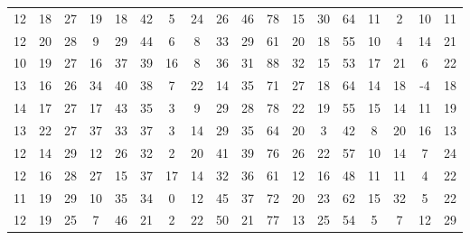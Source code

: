 \begin{sidewaystable}
\begin{tabular}{cccccccccccccccccc}
    12    & 18    & 27    & 19    & 18    & 42    & 5     & 24    & 26    & 46     & 78     & 15     & 30     & 64     & 11     & 2      & 10     & 11     \\
    12    & 20    & 28    & 9     & 29    & 44    & 6     & 8     & 33    & 29     & 61     & 20     & 18     & 55     & 10     & 4      & 14     & 21     \\
    10    & 19    & 27    & 16    & 37    & 39    & 16    & 8     & 36    & 31     & 88     & 32     & 15     & 53     & 17     & 21     & 6      & 22     \\
    13    & 16    & 26    & 34    & 40    & 38    & 7     & 22    & 14    & 35     & 71     & 27     & 18     & 64     & 14     & 18     & -4     & 18     \\
    14    & 17    & 27    & 17    & 43    & 35    & 3     & 9     & 29    & 28     & 78     & 22     & 19     & 55     & 15     & 14     & 11     & 19     \\
    13    & 22    & 27    & 37    & 33    & 37    & 3     & 14    & 29    & 35     & 64     & 20     & 3      & 42     & 8      & 20     & 16     & 13     \\
    12    & 14    & 29    & 12    & 26    & 32    & 2     & 20    & 41    & 39     & 76     & 26     & 22     & 57     & 10     & 14     & 7      & 24     \\
    12    & 16    & 28    & 27    & 15    & 37    & 17    & 14    & 32    & 36     & 61     & 12     & 16     & 48     & 11     & 11     & 4      & 22     \\
    11    & 19    & 29    & 10    & 35    & 34    & 0     & 12    & 45    & 37     & 72     & 20     & 23     & 62     & 15     & 32     & 5      & 22     \\
    12    & 19    & 25    & 7     & 46    & 21    & 2     & 22    & 50    & 21     & 77     & 13     & 25     & 54     & 5      & 7      & 12     & 29     \\
             \end{tabular}
\end{sidewaystable}


